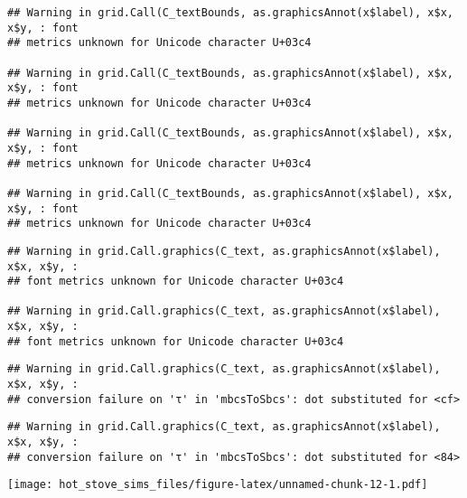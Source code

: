 \documentclass[
]{article}
\begin{document}
\begin{verbatim}
## Warning in grid.Call(C_textBounds, as.graphicsAnnot(x$label), x$x, x$y, : font
## metrics unknown for Unicode character U+03c4

## Warning in grid.Call(C_textBounds, as.graphicsAnnot(x$label), x$x, x$y, : font
## metrics unknown for Unicode character U+03c4

## Warning in grid.Call(C_textBounds, as.graphicsAnnot(x$label), x$x, x$y, : font
## metrics unknown for Unicode character U+03c4

## Warning in grid.Call(C_textBounds, as.graphicsAnnot(x$label), x$x, x$y, : font
## metrics unknown for Unicode character U+03c4
\end{verbatim}

\begin{verbatim}
## Warning in grid.Call.graphics(C_text, as.graphicsAnnot(x$label), x$x, x$y, :
## font metrics unknown for Unicode character U+03c4

## Warning in grid.Call.graphics(C_text, as.graphicsAnnot(x$label), x$x, x$y, :
## font metrics unknown for Unicode character U+03c4
\end{verbatim}

\begin{verbatim}
## Warning in grid.Call.graphics(C_text, as.graphicsAnnot(x$label), x$x, x$y, :
## conversion failure on 'τ' in 'mbcsToSbcs': dot substituted for <cf>
\end{verbatim}

\begin{verbatim}
## Warning in grid.Call.graphics(C_text, as.graphicsAnnot(x$label), x$x, x$y, :
## conversion failure on 'τ' in 'mbcsToSbcs': dot substituted for <84>
\end{verbatim}

\texttt{[image: hot\_stove\_sims\_files/figure-latex/unnamed-chunk-12-1.pdf]}
\end{document}
